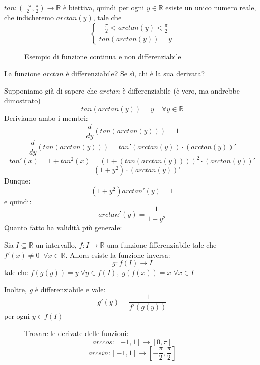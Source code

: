 \documentclass[a4paper]{article}
\theoremstyle{break}
\theoremstyle{break}
\theoremstyle{break}
\theoremstyle{break}
\begin{document}
\( tan: (\frac{-\pi}{2}, \frac{\pi}{2}) \to \mathbb{R} \) è biettiva, quindi per ogni \( y \in \mathbb{R} \)
esiste un unico numero reale, che indicheremo \( arctan(y) \), tale che
\[
  \begin{cases}
    -\frac{\pi}{2} < arctan(y) < \frac{\pi}{2}\\
    tan(arctan(y)) = y
  \end{cases}
\] 
\begin{figure}[H]
  \begin{center}
  \end{center}
  \caption{Esempio di funzione continua e non differenziabile}
\end{figure}

La funzione \( arctan \) è differenziabile? Se sì, chi è la sua derivata?

Supponiamo già di sapere che \( arctan \) è differenziabile (è vero, ma andrebbe dimostrato)
\[
  tan(arctan(y)) = y \;\;\;\;\forall y \in \mathbb{R}
\] 
Deriviamo ambo i membri:
\[
  \frac{d}{dy}(tan(arctan(y))) = 1
\] 
\[
  \frac{d}{dy}(tan(arctan(y)))= tan'(arctan(y)) \cdot (arctan(y))'
\] 
\[
  tan'(x) = 1 + tan^2(x) = (1 + (tan(arctan(y))))^2 \cdot  (arctan(y))'
\] 
\[
  = (1+y^2) \cdot (arctan(y))'
\] 
Dunque:
\[
  (1+y^2)arctan'(y) = 1
\] 
e quindi:
\[
  arctan'(y) = \frac{1}{1+y^2}
\] 
Quanto fatto ha validità più generale:

Sia \( I \subseteq \mathbb{R} \) un intervallo, \( f: I \to \mathbb{R} \) una funzione
fifferenziabile tale che \( f'(x) \neq 0\;\; \forall x \in \mathbb{R}  \).
Allora esiste la funzione inversa:
\[
  g: f(I) \to I
\] 
tale che \( f(g(y))=y\; \forall y \in f(I),\; g(f(x)) = x\; \forall x \in I \)

Inoltre, \( g \) è differenziabile e vale:
\[
  g'(y) = \frac{1}{f'(g(y))}
\] 
per ogni \( y \in f(I) \) 

\begin{figure}[H]
  \begin{exercise}
    Trovare le derivate delle funzioni:
    \[
      arccos: [-1,1] \to [0,\pi]
    \] 
    \[
      arcsin: [-1,1] \to [-\frac{\pi}{2}, \frac{\pi}{2}]
    \] 
  \end{exercise}
\end{figure}
\end{document}
